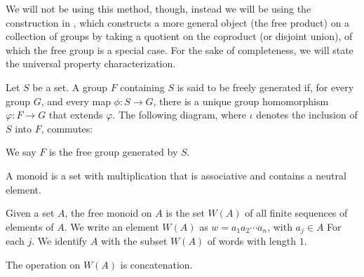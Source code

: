 We will not be using this method, though, instead we will be using the construction in \cite{delaHarpe_topics_in_geometric_group_theory}, which constructs a more general object (the free product) on a collection of groups by taking a quotient on the coproduct (or disjoint union), of which the free group is a special case. For the sake of completeness, we will state the universal property characterization.
\begin{definition}
  Let $S$ be a set. A group $F$ containing $S$ is said to be {freely generated} if, for every group $G$, and every map $\phi\colon S\rightarrow G$, there is a unique group homomorphism $\varphi\colon F\rightarrow G$ that extends $\varphi$. The following diagram, where $\iota$ denotes the inclusion of $S$ into $F$, commutes:

We say $F$ is the {free group} generated by $S$.
\end{definition}
\begin{definition}
  A {monoid} is a set with multiplication that is associative and contains a neutral element.\newline

  Given a set $A$, the free monoid on $A$ is the set $W(A)$ of all finite sequences of elements of $A$. We write an element $W(A)$ as $w = a_1a_2\cdots a_n$, with $a_j\in A$ For each $j$. We identify $A$ with the subset $W(A)$ of words with length $1$.\newline

  The operation on $W(A)$ is concatenation.
\end{definition}

